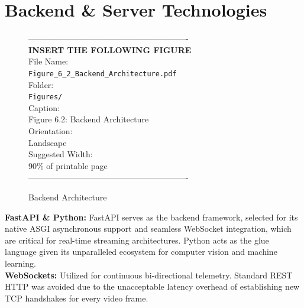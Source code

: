 \section{Backend \& Server Technologies}
\begin{figure}[htbp]
\begin{center}
----------------------------------------------------------\\
\vspace{0.5em}
\textbf{INSERT THE FOLLOWING FIGURE}\\
\vspace{1em}
File Name:\\
\texttt{Figure\_6\_2\_Backend\_Architecture.pdf}\\
\vspace{1em}
Folder:\\
\texttt{Figures/}\\
\vspace{1em}
Caption:\\
Figure 6.2: Backend Architecture\\
\vspace{1em}
Orientation:\\
Landscape\\
\vspace{1em}
Suggested Width:\\
90\% of printable page\\
\vspace{3cm}
----------------------------------------------------------
\end{center}
\caption{Backend Architecture}
\label{fig:diag_2}
\end{figure}
\textbf{FastAPI \& Python:} FastAPI serves as the backend framework, selected for its native ASGI asynchronous support and seamless WebSocket integration, which are critical for real-time streaming architectures. Python acts as the glue language given its unparalleled ecosystem for computer vision and machine learning.
\\
\textbf{WebSockets:} Utilized for continuous bi-directional telemetry. Standard REST HTTP was avoided due to the unacceptable latency overhead of establishing new TCP handshakes for every video frame.

